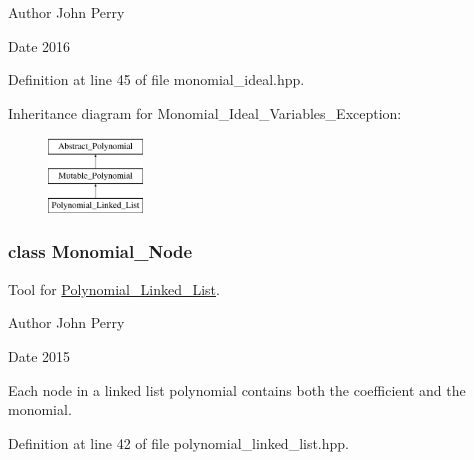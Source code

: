 \begin{DoxyAuthor}{Author}
John Perry 
\end{DoxyAuthor}
\begin{DoxyDate}{Date}
2016 
\end{DoxyDate}


Definition at line 45 of file monomial\+\_\+ideal.\+hpp.

Inheritance diagram for Monomial\+\_\+\+Ideal\+\_\+\+Variables\+\_\+\+Exception\+:\begin{figure}[H]
\begin{center}
\leavevmode
\includegraphics[height=2.000000cm]{group__polygroup}
\end{center}
\end{figure}
\label{class_monomial___node}
\subsubsection{class Monomial\+\_\+\+Node}
Tool for \hyperlink{group__polygroup_class_polynomial___linked___list}{Polynomial\+\_\+\+Linked\+\_\+\+List}. 

\begin{DoxyAuthor}{Author}
John Perry 
\end{DoxyAuthor}
\begin{DoxyDate}{Date}
2015
\end{DoxyDate}
Each node in a linked list polynomial contains both the coefficient and the monomial. 

Definition at line 42 of file polynomial\+\_\+linked\+\_\+list.\+hpp.

